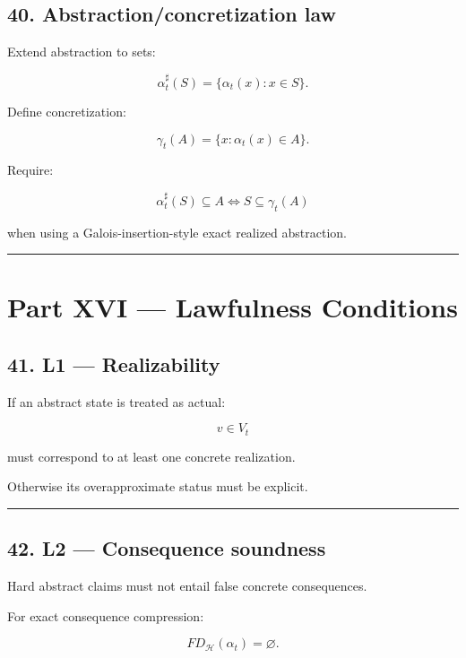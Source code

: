 \documentclass[
]{article}
\begin{document}
\subsection{40. Abstraction/concretization
law}\label{abstractionconcretization-law}

Extend abstraction to sets:

\[
\alpha_t^\sharp(S)
=
\{\alpha_t(x):x\in S\}.
\]

Define concretization:

\[
\gamma_t(A)
=
\{x:\alpha_t(x)\in A\}.
\]

Require:

\[
\boxed{
\alpha_t^\sharp(S)\subseteq A
\iff
S\subseteq\gamma_t(A)
}
\]

when using a Galois-insertion-style exact realized abstraction.

\begin{center}\rule{0.5\linewidth}{0.5pt}\end{center}

\section{Part XVI --- Lawfulness
Conditions}\label{part-xvi-lawfulness-conditions}

\subsection{41. L1 --- Realizability}\label{l1-realizability}

If an abstract state is treated as actual:

\[
v\in V_t
\]

must correspond to at least one concrete realization.

Otherwise its overapproximate status must be explicit.

\begin{center}\rule{0.5\linewidth}{0.5pt}\end{center}

\subsection{42. L2 --- Consequence
soundness}\label{l2-consequence-soundness}

Hard abstract claims must not entail false concrete consequences.

For exact consequence compression:

\[
\boxed{
FD_{\mathcal H}(\alpha_t)=\varnothing.
}
\]
\end{document}
